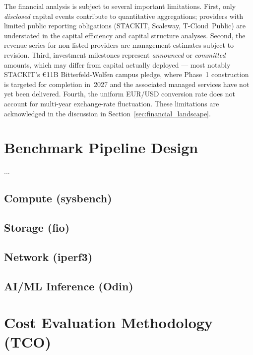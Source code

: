 The financial analysis is subject to several important limitations. First, only \emph{disclosed} capital events contribute to quantitative aggregations; providers with limited public reporting obligations (STACKIT, Scaleway, T-Cloud~Public) are understated in the capital efficiency and capital structure analyses. Second, the revenue series for non-listed providers are management estimates subject to revision. Third, investment milestones represent \emph{announced} or \emph{committed} amounts, which may differ from capital actually deployed --- most notably STACKIT's €11B Bitterfeld-Wolfen campus pledge, where Phase~1 construction is targeted for completion in~2027 and the associated managed services have not yet been delivered. Fourth, the uniform EUR/USD conversion rate does not account for multi-year exchange-rate fluctuation. These limitations are acknowledged in the discussion in Section~\ref{sec:financial_landscape}.

\section{Benchmark Pipeline Design}
\label{sec:benchmark_methodology}

...

\subsection{Compute (sysbench)}
\subsection{Storage (fio)}
\subsection{Network (iperf3)}
\subsection{AI/ML Inference (Odin)}


\section{Cost Evaluation Methodology (TCO)}
\label{sec:tco_methodology}


